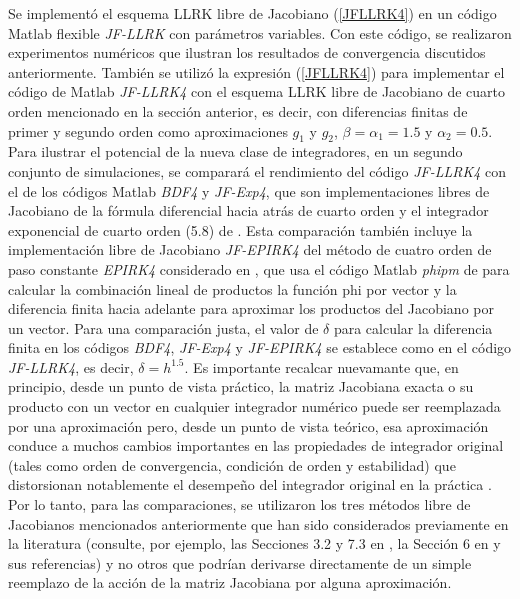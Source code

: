 Se implementó el esquema LLRK libre de Jacobiano (\ref{JFLLRK4}) en un código Matlab flexible \textit{JF-LLRK} con parámetros variables. Con este código, se realizaron experimentos numéricos que ilustran los resultados de convergencia discutidos anteriormente. También se utilizó la expresión (\ref{JFLLRK4}) para implementar el código de Matlab \textit{JF-LLRK4} con el esquema LLRK libre de Jacobiano de cuarto orden mencionado en la sección anterior, es decir, con diferencias finitas de primer y segundo orden como aproximaciones $g_1$ y $g_2$, $\beta=\alpha_1=1.5$ y $\alpha_2=0.5$. Para ilustrar el potencial de la nueva clase de integradores, en un segundo conjunto de simulaciones, se comparará el rendimiento del código \textit{JF-LLRK4} con el de los códigos Matlab \textit{BDF4} y \textit{JF-Exp4}, que son implementaciones libres de Jacobiano de la fórmula diferencial hacia atrás de cuarto orden \cite{hairer1993solving} y el integrador exponencial de cuarto orden (5.8) de \cite{hochbruck1998exponential}. Esta comparación también incluye la implementación libre de Jacobiano \textit{JF-EPIRK4} del método de cuatro orden de paso constante \textit{EPIRK4} \cite{rainwater2016new} considerado en \cite{einkemmer2017performance}, que usa el código Matlab \textit {phipm} de \cite{niesen2012algorithm} para calcular la combinación lineal de productos  la función phi por vector y la diferencia finita hacia adelante para aproximar los productos del Jacobiano por un vector. Para una comparación justa, el valor de $\delta$ para calcular la diferencia finita en los códigos \textit{BDF4}, \textit{JF-Exp4} y \textit{JF-EPIRK4} se establece como en el código \textit {JF-LLRK4}, es decir, $\delta=h^{1.5}$. Es importante recalcar nuevamante que, en principio, desde un punto de vista práctico, la matriz Jacobiana exacta o su producto con un vector en cualquier integrador numérico puede ser reemplazada por una aproximación pero, desde un punto de vista teórico, esa aproximación conduce a muchos cambios importantes en las propiedades de integrador original (tales como orden de convergencia, condición de orden y estabilidad) que distorsionan notablemente el desempeño del integrador original en la práctica \cite{hairer1993solving,hochbruck1998exponential, tranquilli2014rosenbrock}. Por lo tanto, para las comparaciones, se utilizaron los tres métodos libre de Jacobianos mencionados anteriormente que han sido considerados previamente en la literatura (consulte, por ejemplo, las Secciones 3.2 y 7.3 en \cite{hochbruck1998exponential}, la Sección 6 en \cite{einkemmer2017performance} y sus referencias) y no otros que podrían derivarse directamente de un simple reemplazo de la acción de la matriz Jacobiana por alguna aproximación.


